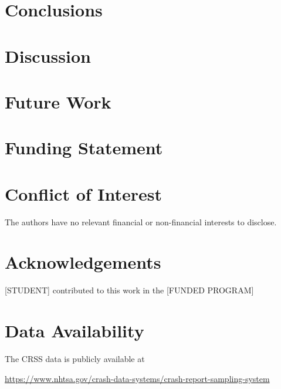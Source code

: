 \documentclass[fleqn]{cas-sc}
\begin{document}
\section{Conclusions}

\section{Discussion}

\section{Future Work}

\section*{Funding Statement}

\section*{Conflict of Interest}

The authors have no relevant financial or non-financial interests to disclose.

\section*{Acknowledgements}

[STUDENT]
contributed to this work in the 
[FUNDED PROGRAM]

\section*{Data Availability}

The CRSS data is publicly available at 

\url{https://www.nhtsa.gov/crash-data-systems/crash-report-sampling-system}


\begin{comment}
\begin{figure}[<options>]
	\centering
		\texttt{[image: ]}
	  \caption{}\label{fig1}
\end{figure}


\begin{table}[<options>]
\caption{}\label{tbl1}
\begin{tabular*}{\tblwidth}{@{}LL@{}}
\toprule
  &  \\ %
\midrule
 & \\
 & \\
 & \\
 & \\
\bottomrule
\end{tabular*}
\end{table}
\end{comment}
\end{document}
